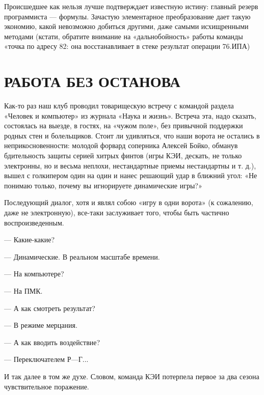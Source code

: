 \documentclass[11pt,a4paper,oneside]{article}
\begin{document}
Происшедшее как нельзя лучше подтверждает известную истину: главный резерв программиста — формулы. Зачастую элементарное преобразование дает такую экономию, какой невозможно добиться другими, даже самыми исхищренными методами (кстати, обратите внимание на «дальнобойность» работы команды «точка по адресу 82: она восстанавливает в стеке результат операции 76.ИПА)

\section{РАБОТА БЕЗ ОСТАНОВА}

Как-то раз наш клуб проводил товарищескую встречу с командой раздела «Человек и компьютер» из журнала «Наука и жизнь». Встреча эта, надо сказать, состоялась на выезде, в гостях, на «чужом поле», без привычной поддержки родных стен и болельщиков. Стоит ли удивляться, что наши ворота не остались в неприкосновенности: молодой форвард соперника Алексей Бойко, обманув бдительность защиты серией хитрых финтов (игры КЭИ, дескать, не только электронны, но и весьма неплохи, нестандартные приемы нестандартны и т. д.), вышел с голкипером один на один и нанес решающий удар в ближний угол: «Не понимаю только, почему вы игнорируете динамические игры?»

Последующий диалог, хотя и являл собою «игру в одни ворота» (к сожалению, даже не электронную), все-таки заслуживает того, чтобы быть частично воспроизведенным.

— Какие-какие?

— Динамические. В реальном масштабе времени.

— На компьютере?

— На ПМК.

— А как смотреть результат?

— В режиме мерцания.

— А как вводить воздействие?

— Переключателем Р—Г...

И так далее в том же духе. Словом, команда КЭИ потерпела первое за два сезона чувствительное поражение.
\end{document}
